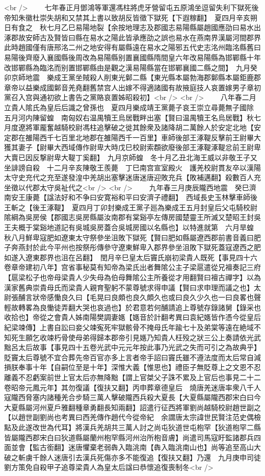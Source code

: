 <br />
　　七年春正月鄧鴻等軍還馮柱將虎牙營留屯五原鴻坐逗留失利下獄死後帝知朱徽杜崇失胡和又禁其上書以致胡反皆徵下獄死【下遐稼翻】　夏四月辛亥朔日有食之　秋七月乙巳易陽地裂【余按地理志及郡國志易陽縣屬趙國應劭曰易水出涿郡故安師古及賢皆曰縣在易水之陽此皆承應劭之誤也易水在燕南界漢屬河間郡界此時趙國僅有唐邢洺二州之地安得有屬縣遠在易水之陽邪五代史志洺州臨洺縣舊曰易陽後齊廢入襄國縣後周改為易陽縣别置襄國縣隋間皇六年改易陽縣為邯鄲縣十年改邯鄲縣為臨洺而别置邯鄲縣由是觀之漢易陽縣當在邯鄲襄國二縣之間】　九月癸卯京師地震　樂成王黨坐賊殺人削東光鄡二縣【東光縣本屬勃海郡鄡縣本屬鉅鹿郡章帝以益樂成國鄡音羌堯翻舊禁宫人出嫁不得適諸國有故掖庭技人哀置嫁男子章初黨召入宫與通初欲上書告之黨賂哀置姊昭殺初】<br />
<br />
　　八年春二月立貴人隂氏為皇后后識之曾孫也　夏四月樂成靖王黨薨子哀王崇立尋薨無子國除　五月河内陳留蝗　南匈奴右温禺犢王烏居戰畔出塞【賢曰温禺犢王名烏居戰】秋七月度遼將軍龎奮越騎校尉馮柱追擊破之徙其餘衆及諸降胡二萬餘人於安定北地【安定郡在雒陽西千七百里北地郡在雒陽西千一百里】車師後部王涿鞮反擊前王尉畢大獲其妻子【尉畢大西域傳作尉卑大時戊巳校尉索頵欲廢後部王涿鞮涿鞮忿前王尉卑大賣已因反撃尉卑大鞮丁奚翻】　九月京師蝗　冬十月乙丑北海王威以非敬王子又坐誹謗自殺　十二月辛亥陳敬王羨薨　丁巳南宫宣室殿火　護羌校尉貫友卒以漢陽太守史充代之充至遂發湟中羌胡出塞擊迷唐迷唐迎敗充兵【敗補邁翻】殺數百人充坐徵以代郡太守吳祉代之<br />
<br />
　　九年春三月庚辰隴西地震　癸巳濟南安王康薨【諡法好和不争曰安寛裕和平曰安濟子禮翻】　西域長史玉林擊車師後王斬之【後王涿鞮】　夏四月丁卯封樂成王黨子廵為樂成王五月封皇后父屯騎校尉隂綱為吳房侯【郡國志吳房縣屬汝南郡有棠谿亭左傳房國楚靈王所滅又楚昭王封吳王夫概于棠谿地道記有吳城吳房蓋合吳城房國以名縣也】以特進就第　六月旱蝗　秋八月鮮卑寇肥如遼東太守祭參坐沮敗下獄死【賢曰肥如縣屬遼西郡前書音義曰肥子奔燕封於此今平州也按祭彤傳參守遼東鮮卑入郡界參坐沮敗下獄死蓋寇遼西之肥如遂入遼東郡界也沮在呂翻】　閏月辛巳皇太后竇氏崩初梁貴人既死【事見四十六卷章帝建初八年】宫省事秘莫有知帝為梁氏出者舞隂公主子梁扈遣從兄襢奏記三府【扈梁松子也帝母梁貴人少失母為伯母舞隂公主所養從才用翻賢曰襢古禪字】以為漢家舊典崇貴母氏而梁貴人親育聖躬不蒙尊號求得申議【賢曰求申理而議之也】太尉張酺言狀帝感慟良久曰【毛晃曰良頗也良久頗久也或曰良久少久也一曰良畧也聲輕故轉畧為良慟徒弄翻大哭也哀過也】於君意若何酺請追上尊號存錄諸舅【錄采也收拾也】帝從之會貴人姊南陽樊調妻嫕【嫕音於計翻考異曰袁紀嫕皆作憑今從皇后紀梁竦傳】上書自訟曰妾父竦寃死牢獄骸骨不掩母氏年踰七十及弟棠等遠在絶域不知死生願乞收竦朽骨使母弟得歸本郡帝引見嫕乃知貴人枉殁之狀三公上奏請依光武黜呂太后故事【事見四十五卷光武中元元年按此事乃光武之失而可引之為故典乎】貶竇太后尊號不宜合葬先帝百官亦多上言者帝手詔曰竇氏雖不遵法度而太后常自減損朕奉事十年【自嗣位至是十年】深惟大義【惟思也】禮臣子無貶尊上之文恩不忍離義不忍虧案前世上官太后亦無降黜【謂上官桀父子誅不累及上官后也事見二十二卷昭帝元鳳元年】其勿復議【復扶又翻】丙申葬章德皇后　燒唐羌迷唐率衆八千人寇隴西脅塞内諸種羌合步騎三萬人擊破隴西兵殺大夏長【大夏縣屬隴西郡宋白曰今大夏縣屬河州夏戶雅翻種章勇翻長知兩翻】詔遣行征西將軍劉尚越騎校尉趙世副之【以趙世副劉尚也考異曰西羌傳作趙代今從帝紀　余謂唐太宗諱世民賢注范史偶檢點及此遂改世為代耳】將漢兵羌胡共三萬人討之尚屯狄道世屯枹罕【狄道枹罕二縣皆屬隴西郡宋白曰狄道縣屬蘭州枹罕縣河州治所枹音膚】尚遣司馬寇盱監諸郡兵四面並會【監古銜翻】迷唐懼棄老弱犇入臨洮南【犇入臨洮南山也】尚等追至高山大破之斬虜千餘人迷唐引去漢兵死傷亦多不能復追【復扶又翻】乃還　九月庚申司徒劉方策免自殺甲子追尊梁貴人為皇太后諡曰恭懷追復喪制冬<br />

